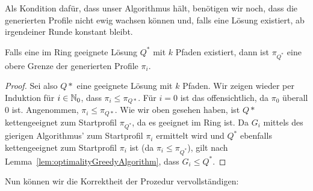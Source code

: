 Als Kondition dafür, dass unser Algorithmus hält, benötigen wir noch, dass die generierten Profile nicht
ewig wachsen können und, falls eine Lösung existiert, ab irgendeiner Runde konstant bleibt.

\begin{lemma}\label{lem:upperBoundProfiles}
    Falls eine im Ring geeignete Lösung $Q^*$ mit $k$ Pfaden existiert, dann ist $\pi_{Q^*}$ eine obere Grenze der
    generierten Profile $\pi_i$.
\end{lemma}
\begin{proof}
    Sei also $Q*$ eine geeignete Lösung mit $k$ Pfaden.
    Wir zeigen wieder per Induktion für $i \in \mathbb N_0$, dass $\pi_i \leq \pi_{Q*}$.
    Für $i=0$ ist das offensichtlich, da $\pi_0$ überall 0 ist.
    Angenommen, $\pi_i \leq \pi_{Q*}$.
    Wie wir oben gesehen haben, ist $Q*$ kettengeeignet zum Startprofil $\pi_{Q^*}$, da es geeignet im Ring ist.
    Da $G_{i}$ mittels des gierigen Algorithmus' zum Startprofil $\pi_i$ ermittelt wird und $Q^*$ ebenfalls kettengeeignet
    zum Startprofil $\pi_i$ ist (da $\pi_i \leq \pi_{Q^*}$), gilt nach Lemma~\ref{lem:optimalityGreedyAlgorithm}, dass $G_{i} \leq Q^*$.
\end{proof}

Nun können wir die Korrektheit der Prozedur vervollständigen:

